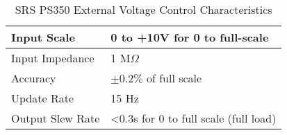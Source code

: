 
\begin{table}
\begin{tabular}{| l | l | }
\hline
Input Scale      & 0 to +10V for 0 to full-scale    \\ \hline
Input Impedance  & 1 M$\Omega$               \\ \hline
Accuracy         & $\pm 0.2\%$ of full scale              \\ \hline
Update Rate      & 15 Hz \\ \hline
Output Slew Rate & \textless 0.3s for 0 to full scale (full load)  \\ \hline
\end{tabular}
\caption{SRS PS350 External Voltage Control Characteristics}\cite{srsManual} \cite{srsCatalog}
\label{srsCtrl_table}
\end{table}
